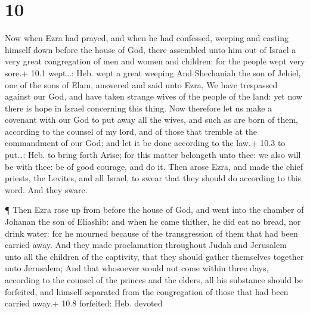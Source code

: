 \hypertarget{section-9}{%
\section{10}\label{section-9}}

 Now when Ezra had prayed, and when he had confessed,
weeping and casting himself down before the house of God, there
assembled unto him out of Israel a very great congregation of men and
women and children: for the people wept very sore.+ 10.1 wept\ldots:
Heb. wept a great weeping  And Shechaniah the son of Jehiel,
one of the sons of Elam, answered and said unto Ezra, We have trespassed
against our God, and have taken strange wives of the people of the land:
yet now there is hope in Israel concerning this thing.  Now
therefore let us make a covenant with our God to put away all the wives,
and such as are born of them, according to the counsel of my lord, and
of those that tremble at the commandment of our God; and let it be done
according to the law.+ 10.3 to put\ldots: Heb. to bring forth
 Arise; for this matter belongeth unto thee: we also will be
with thee: be of good courage, and do it.  Then arose Ezra,
and made the chief priests, the Levites, and all Israel, to swear that
they should do according to this word. And they sware.

 ¶ Then Ezra rose up from before the house of God, and went
into the chamber of Johanan the son of Eliashib: and when he came
thither, he did eat no bread, nor drink water: for he mourned because of
the transgression of them that had been carried away.  And
they made proclamation throughout Judah and Jerusalem unto all the
children of the captivity, that they should gather themselves together
unto Jerusalem;  And that whosoever would not come within
three days, according to the counsel of the princes and the elders, all
his substance should be forfeited, and himself separated from the
congregation of those that had been carried away.+ 10.8 forfeited: Heb.
devoted

